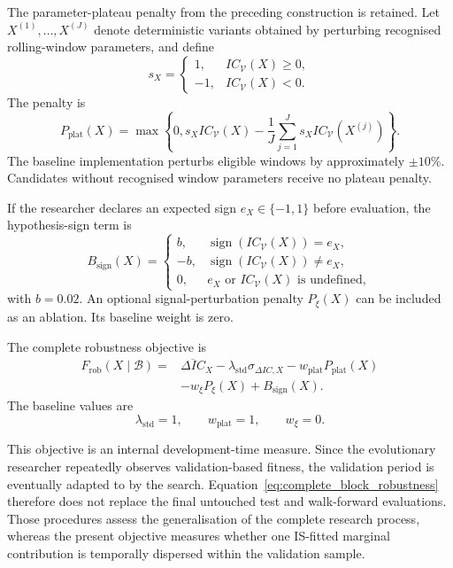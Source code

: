 The parameter-plateau penalty from the preceding construction is retained. Let
\(X^{(1)},\ldots,X^{(J)}\) denote deterministic variants obtained by perturbing
recognised rolling-window parameters, and define
\[
    s_X
    =
    \begin{cases}
        1, & IC_{\mathcal V}(X)\geq0,\\
        -1, & IC_{\mathcal V}(X)<0.
    \end{cases}
\]
The penalty is
\begin{equation}
    P_{\mathrm{plat}}(X)
    =
    \max\left\{
        0,
        s_XIC_{\mathcal V}(X)
        -
        \frac{1}{J}
        \sum_{j=1}^{J}
        s_XIC_{\mathcal V}\left(X^{(j)}\right)
    \right\}.
    \label{eq:block_plateau_penalty}
\end{equation}
The baseline implementation perturbs eligible windows by approximately
\(\pm10\%\). Candidates without recognised window parameters receive no plateau
penalty.

If the researcher declares an expected sign \(e_X\in\{-1,1\}\) before
evaluation, the hypothesis-sign term is
\[
    B_{\mathrm{sign}}(X)
    =
    \begin{cases}
        b,
        & \operatorname{sign}\left(IC_{\mathcal V}(X)\right)=e_X,\\
        -b,
        & \operatorname{sign}\left(IC_{\mathcal V}(X)\right)\neq e_X,\\
        0,
        & e_X\text{ or }IC_{\mathcal V}(X)\text{ is undefined},
    \end{cases}
\]
with \(b=0.02\). An optional signal-perturbation penalty
\(P_{\xi}(X)\) can be included as an ablation. Its baseline weight is zero.

The complete robustness objective is
\begin{equation}
\begin{split}
    F_{\mathrm{rob}}
    \left(
        X\mid\mathcal B
    \right)
    ={}&
    \overline{\Delta IC}_X
    -
    \lambda_{\mathrm{std}}\sigma_{\Delta IC,X}
    -
    w_{\mathrm{plat}}P_{\mathrm{plat}}(X)\\
    &-
    w_{\xi}P_{\xi}(X)
    +
    B_{\mathrm{sign}}(X).
\end{split}
\label{eq:complete_block_robustness}
\end{equation}
The baseline values are
\[
    \lambda_{\mathrm{std}}=1,
    \qquad
    w_{\mathrm{plat}}=1,
    \qquad
    w_{\xi}=0.
\]

This objective is an internal development-time measure. Since the evolutionary
researcher repeatedly observes validation-based fitness, the validation period is
eventually adapted to by the search. Equation~\eqref{eq:complete_block_robustness}
therefore does not replace the final untouched test and walk-forward evaluations.
Those procedures assess the generalisation of the complete research process,
whereas the present objective measures whether one IS-fitted marginal contribution
is temporally dispersed within the validation sample.
